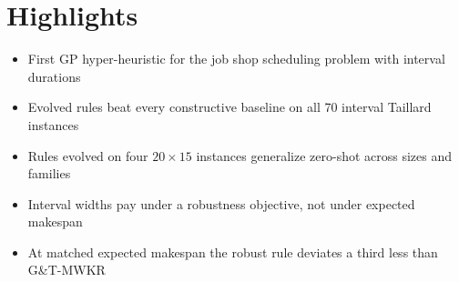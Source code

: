 \documentclass{article}
\begin{document}
\section*{Highlights}
\begin{itemize}
\item First GP hyper-heuristic for the job shop scheduling problem with
interval durations
\item Evolved rules beat every constructive baseline on all 70 interval
Taillard instances
\item Rules evolved on four $20\times15$ instances generalize zero-shot
across sizes and families
\item Interval widths pay under a robustness objective, not under
expected makespan
\item At matched expected makespan the robust rule deviates a third less
than G\&T-MWKR
\end{itemize}
\end{document}
